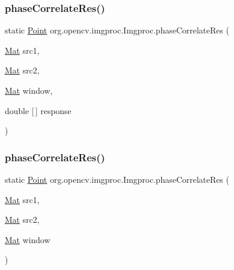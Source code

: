 \subsubsection{\texorpdfstring{phase\+Correlate\+Res()}{phaseCorrelateRes()}\hspace{0.1cm}{\footnotesize\ttfamily [1/2]}}
{\footnotesize\ttfamily static \mbox{\hyperlink{classorg_1_1opencv_1_1core_1_1_point}{Point}} org.\+opencv.\+imgproc.\+Imgproc.\+phase\+Correlate\+Res (\begin{DoxyParamCaption}\item[{\mbox{\hyperlink{classorg_1_1opencv_1_1core_1_1_mat}{Mat}}}]{src1,  }\item[{\mbox{\hyperlink{classorg_1_1opencv_1_1core_1_1_mat}{Mat}}}]{src2,  }\item[{\mbox{\hyperlink{classorg_1_1opencv_1_1core_1_1_mat}{Mat}}}]{window,  }\item[{double \mbox{[}$\,$\mbox{]}}]{response }\end{DoxyParamCaption})\hspace{0.3cm}{\ttfamily [static]}}

\mbox{\label{classorg_1_1opencv_1_1imgproc_1_1_imgproc_a1c576a2bdd5d4adfa3131049865be50e}} 
\subsubsection{\texorpdfstring{phase\+Correlate\+Res()}{phaseCorrelateRes()}\hspace{0.1cm}{\footnotesize\ttfamily [2/2]}}
{\footnotesize\ttfamily static \mbox{\hyperlink{classorg_1_1opencv_1_1core_1_1_point}{Point}} org.\+opencv.\+imgproc.\+Imgproc.\+phase\+Correlate\+Res (\begin{DoxyParamCaption}\item[{\mbox{\hyperlink{classorg_1_1opencv_1_1core_1_1_mat}{Mat}}}]{src1,  }\item[{\mbox{\hyperlink{classorg_1_1opencv_1_1core_1_1_mat}{Mat}}}]{src2,  }\item[{\mbox{\hyperlink{classorg_1_1opencv_1_1core_1_1_mat}{Mat}}}]{window }\end{DoxyParamCaption})\hspace{0.3cm}{\ttfamily [static]}}

